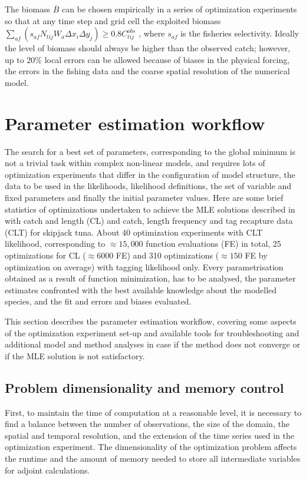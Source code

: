 The biomass $\overline{B}$ can be chosen empirically in a series of optimization experiments so that at any time step and grid cell the exploited biomass $\sum_{af} \left(s_{af} N_{tij} W_a \Delta x_i \Delta y_j\right) \geq 0.8 C^{obs}_{tij}$ , where $s_{af}$ is the fisheries selectivity. Ideally the level of biomass should always be higher than the observed catch; however, up to 20\% local errors can be allowed because of biases in the physical forcing, the errors in the fishing data and the coarse spatial resolution of the numerical model. 

\section{Parameter estimation workflow}\label{sec:fmin}

The search for a best set of parameters, corresponding to the global minimum is not a trivial task within complex non-linear models, and requires lots of optimization experiments that differ in the configuration of model structure, the data to be used in the likelihoods, likelihood definitions, the set of variable and fixed parameters and finally the initial parameter values. Here are some brief statistics of optimizations undertaken to achieve the MLE solutions described in \citet{Senina20b} with catch and length (CL) and catch, length frequency and tag recapture data (CLT) for skipjack tuna. About 40 optimization experiments with CLT likelihood, corresponding to $\approx 15,000$ function evaluations (FE) in total, 25 optimizations for CL ($\approx 6000$ FE) and 310 optimizations ($\approx 150$ FE by optimization on average) with tagging likelihood only. Every parametrisation obtained as a result of function minimization, has to be analysed, the parameter estimates confronted with the best available knowledge about the modelled species, and the fit and errors and biases evaluated. 

This section describes the parameter estimation workflow, covering some aspects of the optimization experiment set-up and available tools for troubleshooting and additional model and method analyses in case if the method does not converge or if the MLE solution is not satisfactory.

\subsection{Problem dimensionality and memory control}

First, to maintain the time of computation at a reasonable level, it is necessary to find a balance between the number of observations, the size of the domain, the spatial and temporal resolution, and the extension of the time series used in the optimization experiment. The dimensionality of the optimization problem affects the runtime and the amount of memory needed to store all intermediate variables for adjoint calculations. 

